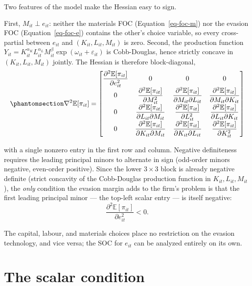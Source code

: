 \documentclass[
  12pt,
  letterpaper,
  oneside,
  openany]{report}
\begin{document}
Two features of the model make the Hessian easy to sign.

First, \(M_{it}\perp e_{it}\): neither the materials FOC
(Equation~\ref{eq-foc-m}) nor the evasion FOC (Equation~\ref{eq-foc-e})
contains the other's choice variable, so every cross-partial between
\(e_{it}\) and \((K_{it},L_{it},M_{it})\) is zero. Second, the
production function
\(Y_{it}=K_{it}^{\alpha_K}L_{it}^{\alpha_L}M_{it}^\beta\exp(\omega_{it}+\varepsilon_{it})\)
is Cobb-Douglas, hence strictly concave in \((K_{it},L_{it},M_{it})\)
jointly. The Hessian is therefore block-diagonal,
\begin{equation}\protect\phantomsection\label{eq-app-soc-hessian}{
\nabla^2\mathbb{E}[\pi_{it}]=
\begin{bmatrix}
\dfrac{\partial^2\mathbb{E}[\pi_{it}]}{\partial e_{it}^2} & 0 & 0 & 0\\[4pt]
0 & \dfrac{\partial^2\mathbb{E}[\pi_{it}]}{\partial M_{it}^2} & \dfrac{\partial^2\mathbb{E}[\pi_{it}]}{\partial M_{it}\partial L_{it}} & \dfrac{\partial^2\mathbb{E}[\pi_{it}]}{\partial M_{it}\partial K_{it}}\\[4pt]
0 & \dfrac{\partial^2\mathbb{E}[\pi_{it}]}{\partial L_{it}\partial M_{it}} & \dfrac{\partial^2\mathbb{E}[\pi_{it}]}{\partial L_{it}^2} & \dfrac{\partial^2\mathbb{E}[\pi_{it}]}{\partial L_{it}\partial K_{it}}\\[4pt]
0 & \dfrac{\partial^2\mathbb{E}[\pi_{it}]}{\partial K_{it}\partial M_{it}} & \dfrac{\partial^2\mathbb{E}[\pi_{it}]}{\partial K_{it}\partial L_{it}} & \dfrac{\partial^2\mathbb{E}[\pi_{it}]}{\partial K_{it}^2}
\end{bmatrix}
}\end{equation}

with a single nonzero entry in the first row and column. Negative
definiteness requires the leading principal minors to alternate in sign
(odd-order minors negative, even-order positive). Since the lower
\(3\times3\) block is already negative definite (strict concavity of the
Cobb-Douglas production function in \(K_{it},L_{it},M_{it}\)), the
\emph{only} condition the evasion margin adds to the firm's problem is
that the first leading principal minor --- the top-left scalar entry ---
is itself negative: \[
\frac{\partial^2\mathbb{E}[\pi_{it}]}{\partial e_{it}^2}<0.
\]

The capital, labour, and materials choices place no restriction on the
evasion technology, and vice versa; the SOC for \(e_{it}\) can be
analyzed entirely on its own.

\section{The scalar condition}\label{the-scalar-condition}
\end{document}
